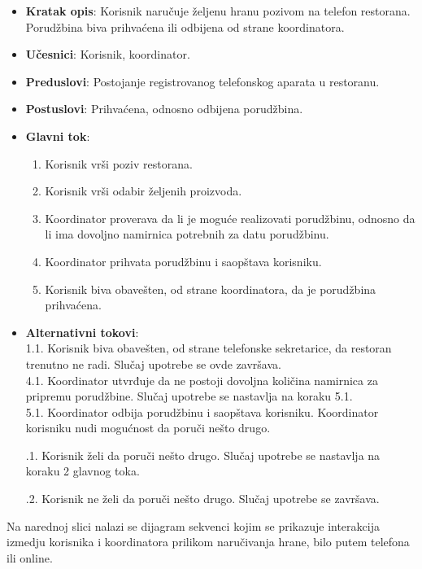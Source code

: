 \begin{itemize}
    \item \textbf{Kratak opis}: Korisnik naručuje željenu hranu pozivom na telefon restorana. Porudžbina biva prihvaćena ili odbijena od strane koordinatora.
    \item \textbf{Učesnici}: Korisnik, koordinator.
    \item \textbf{Preduslovi}: Postojanje registrovanog telefonskog aparata u restoranu.
    \item \textbf{Postuslovi}: Prihvaćena, odnosno odbijena porudžbina.
     \item \textbf{Glavni tok}:
    \begin{enumerate}
        \item Korisnik vrši poziv restorana.
        \item Korisnik vrši odabir željenih proizvoda.
        \item Koordinator proverava da li je moguće realizovati porudžbinu, odnosno
        da li ima dovoljno namirnica potrebnih za datu porudžbinu.
        \item Koordinator prihvata porudžbinu i saopštava korisniku.
        \item Korisnik biva obavešten, od strane koordinatora, da je porudžbina prihvaćena.
    \end{enumerate}
    \item \textbf{Alternativni tokovi}:\\
     1.1. Korisnik biva obavešten, od strane telefonske sekretarice, da restoran trenutno ne radi. Slučaj upotrebe se ovde završava.\\
     4.1. Koordinator utvrđuje da ne postoji dovoljna količina namirnica za pripremu porudžbine. Slučaj upotrebe se nastavlja na koraku 5.1.\\
     5.1. Koordinator odbija porudžbinu i saopštava korisniku. Koordinator korisniku nudi mogućnost da poruči nešto drugo.  
     
      .1. Korisnik želi da poruči nešto drugo. Slučaj upotrebe se nastavlja na koraku 2 glavnog toka. 
      
      .2. Korisnik ne želi da poruči nešto drugo. Slučaj upotrebe se završava. \\
    
    \end{itemize}
Na narednoj slici nalazi se dijagram sekvenci kojim se prikazuje interakcija izmedju korisnika i koordinatora prilikom naručivanja hrane, bilo putem telefona ili online.

